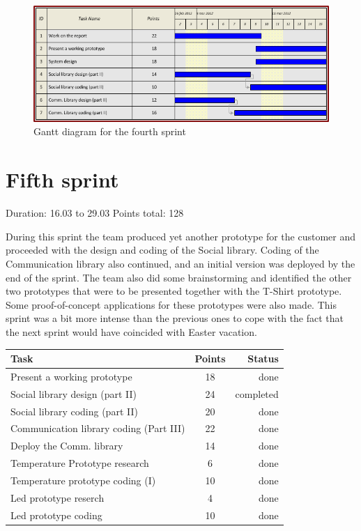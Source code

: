 \begin{figure}[h!]
\centering \includegraphics[scale=0.8]{img/sprints-gantt4.png}
\caption{Gantt diagram for the fourth sprint}
\label{fig:sprints-gantt4}
\end{figure}

\newpage

\section{Fifth sprint}

Duration: 16.03 to 29.03
Points total: 128

During this sprint the team produced yet another prototype for the customer
and proceeded with the design and coding of the Social library.
Coding of the Communication library also continued, and an initial version
was deployed by the end of the sprint. The team also did some brainstorming
and identified the other two prototypes that were to be presented together with
the T-Shirt prototype. Some proof-of-concept applications for these
prototypes were also made. This sprint was a bit more intense than the previous
ones to cope with the fact that the next sprint would have coincided with Easter vacation.

\begin{table}[ht!]
\begin{tabular}{ | l | c | r | }

\hline
\textbf{Task} & \textbf{Points} & \textbf{Status} \\
\hline

Present a working prototype		& 18 & done \\
\hline
Social library design (part II)		& 24 & completed \\
\hline
Social library coding (part II)		& 20 & done \\
\hline
Communication library coding (Part III)	& 22 & done \\
\hline
Deploy the Comm. library		& 14 & done \\
\hline
Temperature Prototype research		& 6  & done \\
\hline
Temperature prototype coding (I)	& 10 & done \\
\hline
Led prototype reserch			& 4  & done \\
\hline
Led prototype coding			& 10 & done \\
\hline

\end{tabular}
\end{table}


